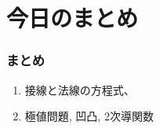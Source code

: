 



\section{今日のまとめ}
\begin{frame}
\frametitle{まとめ}   


\begin{enumerate}
\item 接線と法線の方程式、
\item 極値問題, 凹凸, 2次導関数
\end{enumerate} 

\end{frame}
